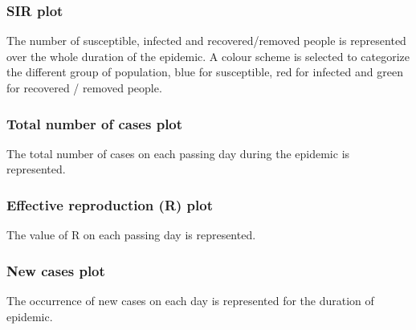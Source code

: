 \documentclass[conference]{IEEEtran}
\begin{document}
            \subsubsection{SIR plot}
                The number of susceptible, infected and recovered/removed people is represented over the whole duration of the epidemic. A colour scheme is selected to categorize the different group of population, blue for susceptible, red for infected and green for recovered / removed people.
            \subsubsection{Total number of cases plot}
                The total number of cases on each passing day during the epidemic is represented.
            \subsubsection{Effective reproduction (R)  plot}
                The value of R on each passing day is represented.
            \subsubsection{New cases plot}
                The occurrence of new cases on each day is represented for the duration of epidemic.\\
\end{document}
